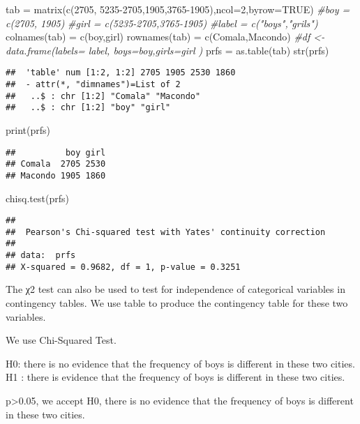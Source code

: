 \documentclass[
]{article}
\newenvironment{Shaded}{\begin{snugshade}}{\end{snugshade}}
\newcommand{\AttributeTok}[1]{\textcolor[rgb]{0.77,0.63,0.00}{#1}}
\newcommand{\CommentTok}[1]{\textcolor[rgb]{0.56,0.35,0.01}{\textit{#1}}}
\newcommand{\ConstantTok}[1]{\textcolor[rgb]{0.00,0.00,0.00}{#1}}
\newcommand{\DecValTok}[1]{\textcolor[rgb]{0.00,0.00,0.81}{#1}}
\newcommand{\FunctionTok}[1]{\textcolor[rgb]{0.00,0.00,0.00}{#1}}
\newcommand{\NormalTok}[1]{#1}
\newcommand{\OtherTok}[1]{\textcolor[rgb]{0.56,0.35,0.01}{#1}}
\newcommand{\StringTok}[1]{\textcolor[rgb]{0.31,0.60,0.02}{#1}}
\begin{document}
\begin{Shaded}
\begin{Highlighting}[]
\NormalTok{tab }\OtherTok{=} \FunctionTok{matrix}\NormalTok{(}\FunctionTok{c}\NormalTok{(}\DecValTok{2705}\NormalTok{, }\DecValTok{5235{-}2705}\NormalTok{,}\DecValTok{1905}\NormalTok{,}\DecValTok{3765{-}1905}\NormalTok{),}\AttributeTok{ncol=}\DecValTok{2}\NormalTok{,}\AttributeTok{byrow=}\ConstantTok{TRUE}\NormalTok{)}
\CommentTok{\#boy = c(2705, 1905)}
\CommentTok{\#girl = c(5235{-}2705,3765{-}1905)}
\CommentTok{\#label = c("boys","grils")}
\FunctionTok{colnames}\NormalTok{(tab) }\OtherTok{=} \FunctionTok{c}\NormalTok{(}\StringTok{\textquotesingle{}boy\textquotesingle{}}\NormalTok{,}\StringTok{\textquotesingle{}girl\textquotesingle{}}\NormalTok{)}
\FunctionTok{rownames}\NormalTok{(tab) }\OtherTok{=} \FunctionTok{c}\NormalTok{(}\StringTok{\textquotesingle{}Comala\textquotesingle{}}\NormalTok{,}\StringTok{\textquotesingle{}Macondo\textquotesingle{}}\NormalTok{)}
\CommentTok{\#df \textless{}{-} data.frame(labels= label, boys=boy,girls=girl  )}
\NormalTok{prfs }\OtherTok{=} \FunctionTok{as.table}\NormalTok{(tab)}
\FunctionTok{str}\NormalTok{(prfs)}
\end{Highlighting}
\end{Shaded}

\begin{verbatim}
##  'table' num [1:2, 1:2] 2705 1905 2530 1860
##  - attr(*, "dimnames")=List of 2
##   ..$ : chr [1:2] "Comala" "Macondo"
##   ..$ : chr [1:2] "boy" "girl"
\end{verbatim}

\begin{Shaded}
\begin{Highlighting}[]
\FunctionTok{print}\NormalTok{(prfs)}
\end{Highlighting}
\end{Shaded}

\begin{verbatim}
##          boy girl
## Comala  2705 2530
## Macondo 1905 1860
\end{verbatim}

\begin{Shaded}
\begin{Highlighting}[]
\FunctionTok{chisq.test}\NormalTok{(prfs)}
\end{Highlighting}
\end{Shaded}

\begin{verbatim}
## 
##  Pearson's Chi-squared test with Yates' continuity correction
## 
## data:  prfs
## X-squared = 0.9682, df = 1, p-value = 0.3251
\end{verbatim}

The χ2 test can also be used to test for independence of categorical
variables in contingency tables. We use table to produce the contingency
table for these two variables.

We use Chi-Squared Test.

H0: there is no evidence that the frequency of boys is different in
these two cities. H1 : there is evidence that the frequency of boys is
different in these two cities.

p\textgreater0.05, we accept H0, there is no evidence that the frequency
of boys is different in these two cities.
\end{document}
